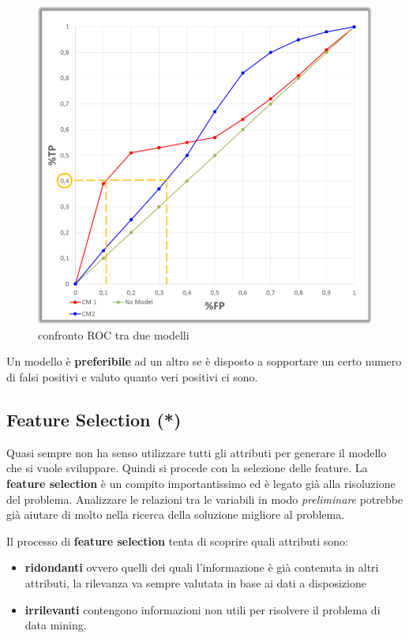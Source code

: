 \begin{figure}[H]
	\centering
	\includegraphics[height=0.6 \linewidth]{classification/pict/roc_confronto.png}
	\caption{confronto ROC tra due modelli}
\end{figure}

Un modello \`e \textbf{preferibile} ad un altro se \`e disposto a sopportare un certo numero di falsi positivi e valuto quanto veri positivi ci sono. 


\subsection{Feature Selection (*)}
Quasi sempre non ha senso utilizzare tutti gli attributi per generare il modello che si vuole sviluppare. Quindi si procede con la selezione delle feature.
La \textbf{feature selection} \`e un compito importantissimo ed \`e legato gi\`a alla risoluzione del problema. Analizzare le relazioni tra le variabili in modo \textit{preliminare} potrebbe gi\`a aiutare di molto nella ricerca della soluzione migliore al problema. 
\begin{defn}
Il processo di \textbf{feature selection} tenta di scoprire quali attributi sono:
\begin{itemize}
	\item \textbf{ridondanti} ovvero quelli dei quali l'informazione \`e gi\`a contenuta in altri attributi, la rilevanza va sempre valutata in base ai dati a disposizione
	\item \textbf{irrilevanti} contengono informazioni non utili per risolvere il problema di data mining.
\end{itemize}
\end{defn}


